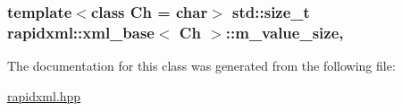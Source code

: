 \subsubsection[{m\+\_\+value\+\_\+size}]{\setlength{\rightskip}{0pt plus 5cm}template$<$class Ch  = char$>$ std\+::size\+\_\+t {\bf rapidxml\+::xml\+\_\+base}$<$ Ch $>$\+::m\+\_\+value\+\_\+size\hspace{0.3cm}{\ttfamily [protected]}, {\ttfamily [inherited]}}\label{classrapidxml_1_1xml__base_aa3a49d8ceddb8a8d7edb773a2226b89c}


The documentation for this class was generated from the following file\+:\begin{DoxyCompactItemize}
\item 
\hyperlink{rapidxml_8hpp}{rapidxml.\+hpp}\end{DoxyCompactItemize}
